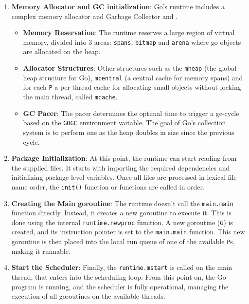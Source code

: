 \begin{enumerate}
    \item \textbf{Memory Allocator and \gls{GC} initialization}: Go's runtime includes a complex memory allocator and Garbage Collector \cite{go:memory-distribution} and \cite{go:memory-internals}.
    \begin{itemize}
        \item \textbf{Memory Reservation}: The runtime reserves a large region of virtual memory, divided into 3 areas: \texttt{spans}, \texttt{bitmap} and \texttt{arena} where go objects are allocated on the heap.
        \item \textbf{Allocator Structures}: Other structures such as the \texttt{mheap} (the global heap structure for Go), \texttt{mcentral} (a central cache for memory spans) and for each \texttt{P} a per-thread cache for allocating small objects without locking the main thread, called \texttt{mcache}.
        \item \textbf{\gls{GC} Pacer}: The pacer determines the optimal time to trigger a \gls{gc-cycle} based on the \texttt{GOGC} environment variable. The goal of Go's collection system is to perform one as the heap doubles in size since the previous cycle.
    \end{itemize}
        
    \item \textbf{Package Initialization}: At this point, the runtime can start reading from the supplied files. It starts with importing the required dependencies and initializing package-level variables. Once all files are processed in lexical file name order, the \texttt{init()} function or functions are called in order. 
        
    \item \textbf{Creating the Main \Gls{goroutine}}: The runtime doesn't call the \texttt{main.main} function directly. Instead, it creates a new \gls{goroutine} to execute it. This is done using the internal \texttt{runtime.newproc} function. A new \gls{goroutine} (\texttt{G}) is created, and its instruction pointer is set to the \texttt{main.main} function. This new \gls{goroutine} is then placed into the local run queue of one of the available \texttt{P}s, making it runnable.
        
    \item \textbf{Start the Scheduler}: Finally, the \texttt{runtime.mstart} is called on the main thread, that enters into the scheduling loop. From this point on, the Go program is running, and the scheduler is fully operational, managing the execution of all goroutines on the available threads.
        
\end{enumerate}



